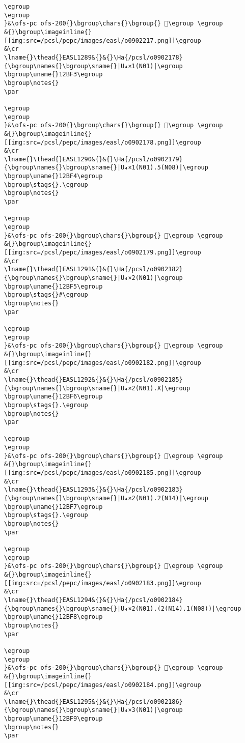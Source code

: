 \begin{verbatim}
\egroup
\egroup
}&\ofs-pc ofs-200{}\bgroup\chars{}\bgroup{} 𒯲\egroup \egroup
&{}\bgroup\imageinline{}[[img:src=/pcsl/pepc/images/easl/o0902217.png]]\egroup
&\cr
\lname{}\thead{}EASL1289&{}&{}\Ha{/pcsl/o0902178}{\bgroup\names{}\bgroup\sname{}|U₄×1(N01)|\egroup
\bgroup\uname{}12BF3\egroup
\bgroup\notes{}
\par 

\egroup
\egroup
}&\ofs-pc ofs-200{}\bgroup\chars{}\bgroup{} 𒯳\egroup \egroup
&{}\bgroup\imageinline{}[[img:src=/pcsl/pepc/images/easl/o0902178.png]]\egroup
&\cr
\lname{}\thead{}EASL1290&{}&{}\Ha{/pcsl/o0902179}{\bgroup\names{}\bgroup\sname{}|U₄×1(N01).5(N08)|\egroup
\bgroup\uname{}12BF4\egroup
\bgroup\stags{}.\egroup
\bgroup\notes{}
\par 

\egroup
\egroup
}&\ofs-pc ofs-200{}\bgroup\chars{}\bgroup{} 𒯴\egroup \egroup
&{}\bgroup\imageinline{}[[img:src=/pcsl/pepc/images/easl/o0902179.png]]\egroup
&\cr
\lname{}\thead{}EASL1291&{}&{}\Ha{/pcsl/o0902182}{\bgroup\names{}\bgroup\sname{}|U₄×2(N01)|\egroup
\bgroup\uname{}12BF5\egroup
\bgroup\stags{}#\egroup
\bgroup\notes{}
\par 

\egroup
\egroup
}&\ofs-pc ofs-200{}\bgroup\chars{}\bgroup{} 𒯵\egroup \egroup
&{}\bgroup\imageinline{}[[img:src=/pcsl/pepc/images/easl/o0902182.png]]\egroup
&\cr
\lname{}\thead{}EASL1292&{}&{}\Ha{/pcsl/o0902185}{\bgroup\names{}\bgroup\sname{}|U₄×2(N01).X|\egroup
\bgroup\uname{}12BF6\egroup
\bgroup\stags{}.\egroup
\bgroup\notes{}
\par 

\egroup
\egroup
}&\ofs-pc ofs-200{}\bgroup\chars{}\bgroup{} 𒯶\egroup \egroup
&{}\bgroup\imageinline{}[[img:src=/pcsl/pepc/images/easl/o0902185.png]]\egroup
&\cr
\lname{}\thead{}EASL1293&{}&{}\Ha{/pcsl/o0902183}{\bgroup\names{}\bgroup\sname{}|U₄×2(N01).2(N14)|\egroup
\bgroup\uname{}12BF7\egroup
\bgroup\stags{}.\egroup
\bgroup\notes{}
\par 

\egroup
\egroup
}&\ofs-pc ofs-200{}\bgroup\chars{}\bgroup{} 𒯷\egroup \egroup
&{}\bgroup\imageinline{}[[img:src=/pcsl/pepc/images/easl/o0902183.png]]\egroup
&\cr
\lname{}\thead{}EASL1294&{}&{}\Ha{/pcsl/o0902184}{\bgroup\names{}\bgroup\sname{}|U₄×2(N01).(2(N14).1(N08))|\egroup
\bgroup\uname{}12BF8\egroup
\bgroup\notes{}
\par 

\egroup
\egroup
}&\ofs-pc ofs-200{}\bgroup\chars{}\bgroup{} 𒯸\egroup \egroup
&{}\bgroup\imageinline{}[[img:src=/pcsl/pepc/images/easl/o0902184.png]]\egroup
&\cr
\lname{}\thead{}EASL1295&{}&{}\Ha{/pcsl/o0902186}{\bgroup\names{}\bgroup\sname{}|U₄×3(N01)|\egroup
\bgroup\uname{}12BF9\egroup
\bgroup\notes{}
\par 


\end{verbatim}
